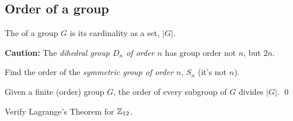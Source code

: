 \documentclass[../algebraNotesMSRI-UP2016.tex]{subfiles}
\begin{document}
\subsection[\subsecname]{Order of a group}
\begin{frame}[c]{\subsecname}
\begin{dfn}
The  of a group $G$ is its cardinality as a set, $|G|$.
\end{dfn}

\smallGap
\textbf{Caution:} The \emph{dihedral group $D_n$ of order $n$} has group order not $n$, but $2n$.  

\smallGap
\begin{exe}\label{exe:orderOfSn}
Find the order of the \emph{symmetric group of order $n$}, $S_n$ (it's not $n$).
\end{exe}  
\end{frame}

\begin{frame}[c]
\begin{thm}\label{thm:Lagrange}
Given a finite (order) group $G$, the order of every subgroup of $G$ divides $|G|$.
\qed
\end{thm}

\smallGap
\begin{que}
Verify Lagrange's Theorem for $\mathbb Z_{12}$. 
\end{que}
\end{frame}

\begin{comment}
\answerKey
\begin{frame}{\subsecname}
\exeSol[(cf. Problem 53)]{exe:prob53}
\end{frame}

\begin{frame}
\exeSol[(cf. Problem 55)]{exe:prob55}
\end{frame}

\begin{frame}
\exeSol{exe:orderOfSn}
\end{frame}

\end{comment}
\end{document}
